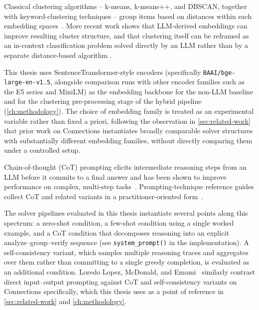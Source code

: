 Classical clustering algorithms -- k-means, k-means++, and DBSCAN,
together with keyword-clustering techniques -- group items based on
distances within such embedding spaces~\cite{ester1996dbscan,
arthur2007kmeanspp}. More recent work shows that LLM-derived embeddings
can improve resulting cluster structure, and that clustering itself can
be reframed as an in-context classification problem solved directly by an
LLM rather than by a separate distance-based algorithm
\cite{huang2025textclustering, petukhova2025}.

This thesis uses SentenceTransformer-style encoders (specifically
\texttt{BAAI/bge-large-en-v1.5}, alongside comparison runs with other
encoder families such as the E5 series and MiniLM) as the embedding
backbone for the non-LLM baseline and for the clustering pre-processing
stage of the hybrid pipeline (\autoref{ch:methodology}). The choice of
embedding family is treated as an experimental variable rather than fixed
a priori, following the observation in \autoref{sec:related-work}
that prior work on Connections instantiates broadly comparable solver
structures with substantially different embedding families, without
directly comparing them under a controlled setup.

\label{sec:prompting}

Chain-of-thought (CoT) prompting elicits intermediate reasoning steps
from an LLM before it commits to a final answer and has been shown to
improve performance on complex, multi-step tasks~\cite{wei2022cot}.
Prompting-technique reference guides collect CoT and related variants in
a practitioner-oriented form~\cite{promptguide-cot}.

The solver pipelines evaluated in this thesis instantiate several points
along this spectrum: a zero-shot condition, a few-shot condition using a
single worked example, and a CoT condition that decomposes reasoning into
an explicit analyze--group--verify sequence (see \texttt{system\_prompt()}
in the implementation). A self-consistency variant, which samples
multiple reasoning traces and aggregates over them rather than committing
to a single greedy completion, is evaluated as an additional condition.
Loredo Lopez, McDonald, and Emami~\cite{loredolopez2025} similarly
contrast direct input--output prompting against CoT and self-consistency
variants on Connections specifically, which this thesis uses as a point
of reference in \autoref{sec:related-work} and
\autoref{ch:methodology}.

